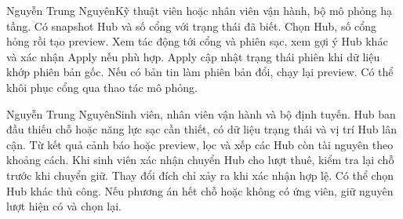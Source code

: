 {Nguyễn Trung Nguyên}{Kỹ thuật viên hoặc nhân viên vận hành, bộ mô phỏng hạ tầng.}
{Có snapshot Hub và số cổng với trạng thái đã biết.}
{Chọn Hub, số cổng hỏng rồi tạo preview. Xem tác động tới cổng và phiên sạc, xem gợi ý Hub khác và xác nhận Apply nếu phù hợp.}
{Apply cập nhật trạng thái phiên khi dữ liệu khớp phiên bản gốc. Nếu có bản tin làm phiên bản đổi, chạy lại preview. Có thể khôi phục cổng qua thao tác mô phỏng.}

{Nguyễn Trung Nguyên}{Sinh viên, nhân viên vận hành và bộ định tuyến.}
{Hub ban đầu thiếu chỗ hoặc năng lực sạc cần thiết, có dữ liệu trạng thái và vị trí Hub lân cận.}
{Từ kết quả cảnh báo hoặc preview, lọc và xếp các Hub còn tài nguyên theo khoảng cách. Khi sinh viên xác nhận chuyển Hub cho lượt thuê, kiểm tra lại chỗ trước khi chuyển giữ.}
{Thay đổi đích chỉ xảy ra khi xác nhận hợp lệ. Có thể chọn Hub khác thủ công. Nếu phương án hết chỗ hoặc không có ứng viên, giữ nguyên lượt hiện có và chọn lại.}
